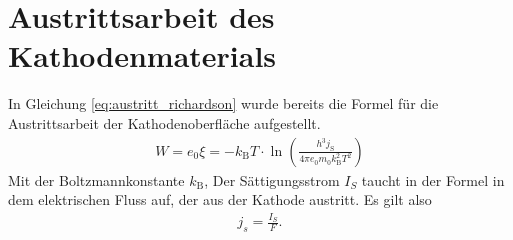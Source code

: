 \section{Austrittsarbeit des Kathodenmaterials}

In Gleichung \eqref{eq:austritt_richardson} wurde bereits die Formel für die Austrittsarbeit der Kathodenoberfläche aufgestellt.
\begin{align*}
    W = e_0 \xi = - k_\text{B} T \cdot \ln\left(\frac{h^3 j_\text{S}}{4 \pi e_0 m_0 k_\text{B}^2 T^2}\right)
\end{align*}
Mit der Boltzmannkonstante $k_\text{B}$, 
Der Sättigungsstrom $I_S$ taucht in der Formel in dem elektrischen Fluss auf,  der aus der Kathode austritt.
Es gilt also
\begin{align}
    j_s = \frac{I_S}{F}.  
\end{align}


